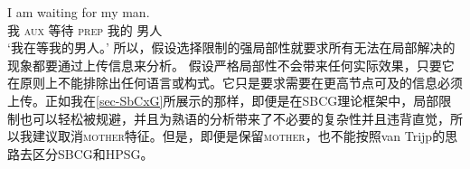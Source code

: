 \ea
\gll I am waiting for my man.\\
    我 \textsc{aux} 等待 \textsc{prep} 我的 男人\\
\glt `我在等我的男人。'
\z 
所以，假设选择限制的强局部性就要求所有无法在局部解决的现象都要通过上传信息来分析。
假设严格局部性不会带来任何实际效果，只要它在原则上不能排除出任何语言或构式。它只是要求需要在更高节点可及的信息必须上传。正如我在\ref{sec-SbCxG}所展示的那样，即便是在SBCG理论框架中，局部限制也可以轻松被规避，并且为熟语的分析带来了不必要的复杂性并且违背直觉，所以我建议取消\textsc{mother}特征。但是，即便是保留\textsc{mother}，也不能按照van Trijp的思路去区分SBCG和HPSG。

